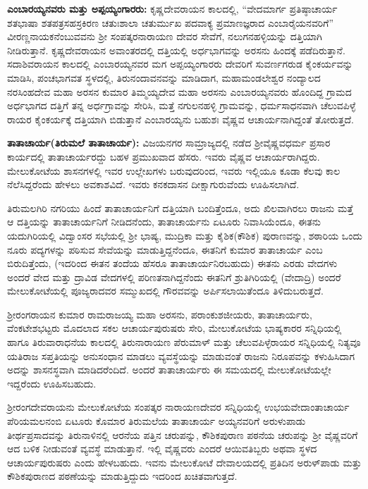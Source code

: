 \textbf{ಎಂಬಾರಯ್ಯನವರು ಮತ್ತು ಅಪ್ಪಯ್ಯಂಗಾರರು:} ಕೃಷ್ಣದೇವರಾಯನ ಕಾಲದಲ್ಲಿ, “ವೇದಮಾರ್ಗ ಪ್ರತಿಷ್ಠಾಚಾರ್ಯ ಶತಭಾಷಾ ಶತಪತ್ರಸಹಸ್ರಕಿರಣ ಚತುಃಶಾಲಾ ಚತುರ್ಮುಖ ಪದವಾಕ್ಯ ಪ್ರಮಾಣಜ್ಞರಾದ ಎಂಬಾರೈಯನವರಿಗೆ” ವೀರಣ್ಣನಾಯಕನೆಂಬುವವನು ಶ‍್ರೀ ಸಂಪತ್ಕರನಾರಾಯಣ ದೇವರ ಸೇವೆಗೆ, ನಲುಗನಹಳ್ಳಿಯನ್ನು ದತ್ತಿಯಾಗಿ ನೀಡಿರುತ್ತಾನೆ. ಕೃಷ್ಣದೇವರಾಯನ ಅವಾಂತರದಲ್ಲಿ ದತ್ತಿಯಲ್ಲಿ ಅರ್ಧಭಾಗವನ್ನು ಅರಸನು ಹಿಂದಕ್ಕೆ ಪಡೆದಿರುತ್ತಾನೆ. ಸದಾಶಿವರಾಯನ ಕಾಲದಲ್ಲಿ ಎಂಬಾರಯ್ಯನವರ ಮಗ ಅಪ್ಪಯ್ಯಂಗಾರರು ದೇವರಿಗೆ ಸುವರ್ಣಗರುಡ ಕೈಂಕರ್ಯವನ್ನು ಮಾಡಿಸಿ, ಪಂಚಭಾಗವತ ಸ್ಥಳದಲ್ಲಿ, ತಿರುನಂದಾವನವನ್ನು ಮಾಡಿದಾಗ, ಮಹಾಮಂಡಲೇಶ್ವರ ನಂದ್ಯಾಲದ ನರಸಿಂಹದೇವ ಮಹಾ ಅರಸನ ಕುಮಾರ ತಿಮ್ಮಯ್ಯದೇವ ಮಹಾ ಅರಸನು ಎಂಬಾರಯ್ಯನವರು ಹೊಂದಿದ್ದ ಗ್ರಾಮದ ಅರ್ಧಭಾಗದ ದತ್ತಿಗೆ ತನ್ನ ಅರ್ಧಗ್ರಾವನ್ನು ಸೇರಿಸಿ, ಮತ್ತೆ ನಗುಲನಹಳ್ಳಿ ಗ್ರಾಮವನ್ನು, ಧರ್ಮಸಾಧನವಾಗಿ ಚೆಲುವಪಿಳ್ಳೆ ರಾಯರ ಕೈಂಕರ್ಯಕ್ಕೆ ದತ್ತಿಯಾಗಿ ಬಿಡುತ್ತಾನೆ ಎಂಬಾರಯ್ಯನು ಬಹುಶಃ ವೈಷ್ಣವ ಆಚಾರ್ಯನಾಗಿದ್ದಂತೆ ತೋರುತ್ತದೆ.

\textbf{ತಾತಾಚಾರ್ಯ(ತಿರುಮಲೆ ತಾತಾಚಾರ್ಯ):} ವಿಜಯನಗರ ಸಾಮ್ರಾಜ್ಯದಲ್ಲಿ ನಡೆದ ಶ‍್ರೀವೈಷ್ಣವಧರ್ಮ ಪ್ರಸಾರ ಕಾರ್ಯದಲ್ಲಿ ತಾತಾಚಾರ್ಯರದ್ದು ಬಹಳ ಪ್ರಮುಖವಾದ ಹೆಸರು. ಇವರು ವೈಷ್ಣವ ಆಚಾರ್ಯರಾಗಿದ್ದರು. ಮೇಲುಕೋಟೆಯ ಶಾಸನಗಳಲ್ಲಿ ಇವರ ಉಲ್ಲೇಖಗಳು ಬರುವುದರಿಂದ, ಇವರು ಇಲ್ಲಿಯೂ ಕೂಡಾ ಕೆಲವು ಕಾಲ ನೆಲೆಸಿದ್ದರೆಂದು ಹೇಳಲು ಅವಕಾಶವಿದೆ. ಇವರು ಕನಕದಾಸನ ದೀಕ್ಷಾಗುರುವೆಂದು ಊಹಿಸಲಾಗಿದೆ. 

ತಿರುಮಲಗಿರಿ ನಗರಿಯು ಹಿಂದೆ ತಾತಾಚಾರ್ಯನಿಗೆ ದತ್ತಿಯಾಗಿ ಬಂದಿತ್ತೆಂದೂ, ಅದು ಖಿಲವಾಗಿರಲು ರಾಜನು ಮತ್ತೆ ಆ ದತ್ತಿಯನ್ನು ತಾತಾಚಾರ್ಯನಿಗೆ ನೀಡಿದನೆಂದು, ತಾತಾಚಾರ್ಯನು ಏಟೂರು ನಿವಾಸಿಯೆಂದೂ, ಈತನು ಯದುಗಿರಿಯಲ್ಲಿ ವಿದ್ವಾಂಸರ ಸಭೆಯಲ್ಲಿ ಶ‍್ರೀ ಭಾಷ್ಯ, ಮುದ್ರಿಕಾ ಮತ್ತು ಕೈಶಿಕ(ಕೌಶಿಕ) ಪುರಾಣವನ್ನು, ಶಠಾರಿಯ ಒಂದು ನೂರು ಪದ್ಯಗಳನ್ನು ಪಠಿಸುವ ಸೇವೆಯನ್ನು ಮಾಡುತ್ತಿದ್ದನೆಂದೂ, ಈತನಿಗೆ ಕುಮಾರ ತಾತಾಚಾರ್ಯ ಎಂಬ ಬಿರುದಿತ್ತೆಂದು, (ಇದರಿಂದ ಈತನ ತಂದೆಯ ಹೆಸರೂ ತಾತಾಚಾರ್ಯನಿರಬಹುದು) ಈತನು ಎರಡು ವೇದಗಳು ಅಂದರೆ ವೇದ ಮತ್ತು ದ್ರಾವಿಡ ವೇದಗಳಲ್ಲಿ ಪರಿಣತನಾಗಿದ್ದನೆಂದು ಈತನಿಗೆ ಶ್ರುತಿಗಿರಿಯಲ್ಲಿ (ವೇದಾದ್ರಿ) ಅಂದರೆ ಮೇಲುಕೋಟೆಯಲ್ಲಿ ಪೂಜ್ಯರಾದವರ ಸಮ್ಮುಖದಲ್ಲಿ ಗೌರವವನ್ನು ಅರ್ಪಿಸಲಾಯಿತೆಂದೂ ತಿಳಿದುಬರುತ್ತದೆ.

ಶ‍್ರೀರಂಗರಾಯನ ಕುಮಾರ ರಾಮರಾಜಯ್ಯ ಮಹಾ ಅರಸನು, ಪರಾಂಕುಶಜೀಯರು, ತಾತಾಚಾರ್ಯರು, ವೆಂಕಟೇಶಭಟ್ಟರು ಮೊದಲಾದ ಸಕಲ ಆಚಾರ್ಯಪುರುಷರು ಸೇರಿ, ಮೇಲುಕೋಟೆಯ ಭಾಷ್ಯಕಾರರ ಸನ್ನಿಧಿಯಲ್ಲಿ ಹಾಗೂ ತಿರುವಾರಾಧನೆಯ ಕಾಲದಲ್ಲಿ ತಿರುನಾರಾಯಣ ಪೆರುಮಾಳ್​ ಮತ್ತು ಚೆಲುವಪಿಳ್ಳೆರಾಯರ ಸನ್ನಿಧಿಯಲ್ಲಿ ನಿತ್ಯವೂ ಯತಿರಾಜ ಸಪ್ತತಿಯನ್ನು ಅನುಸಂಧಾನ ಮಾಡಲು ವ್ಯವಸ್ಥೆಯನ್ನು ಮಾಡುವಂತೆ ರಾಜನು ನಿರೂಪವನ್ನು ಕಳುಹಿಸಿದಾಗ ಅದನ್ನು ಶಾಸನಸ್ಥವಾಗಿ ಮಾಡಿದರೆಂದಿದೆ. ಅಂದರೆ ತಾತಾಚಾರ್ಯರು ಈ ಸಮಯದಲ್ಲಿ ಮೇಲುಕೋಟೆಯಲ್ಲೇ ಇದ್ದರೆಂದು ಊಹಿಸಬಹುದು.

ಶ‍್ರೀರಂಗದೇವರಾಯನು ಮೇಲುಕೋಟೆಯ ಸಂಪತ್ಕರ ನಾರಾಯಣದೇವರ ಸನ್ನಿಧಿಯಲ್ಲಿ ಉಭಯವೇದಾಂತಾಚಾರ್ಯ ಪೆರಿಯಮಲನಂಬಿ ಏಟೂರು ಕೊಮಾರ ತಿರುಮಲೆಯ ತಾತಾಚಾರ್ಯ ಅಯ್ಯನವರಿಗೆ ಅರುಳುಪಾಡು ತೀರ್ಥಪ್ರಸಾದವನ್ನು ತಿರುನಾಳಿನಲ್ಲಿ ಆರನೆಯ ಪತ್ತಿನ ಚರುಪನ್ನು, ಕೌಶಿಕಪುರಾಣ ಪಠನೆಯ ಚರುಪನ್ನು ಶ‍್ರೀ ವೈಷ್ಣವರಿಗೆ ಆದ ಬಳಿಕ ನೀಡುವಂತೆ ವ್ಯವಸ್ಥೆ ಮಾಡುತ್ತಾನೆ. ಇಲ್ಲಿ ವೈಷ್ಣವರು ಎಂದರೆ ಆಯಿವತಿಬ್ಬರು ಅಥವಾ ಸ್ಥಳದ ಆಚಾರ್ಯಪುರುಷರು ಎಂದು ಹೇಳಬಹುದು. ಇವನು ಮೇಲುಕೋಟೆ ದೇವಾಲಯದಲ್ಲಿ ಪ್ರತಿದಿನ ಅರುಳ್​ಪಾಡು ಮತ್ತು ಕೌಶಿಕಪುರಾಣದ ಪಠಣೆಯನ್ನು ಮಾಡುತ್ತಿದ್ದುದು ಇದರಿಂದ ಖಚಿತವಾಗುತ್ತದೆ.

